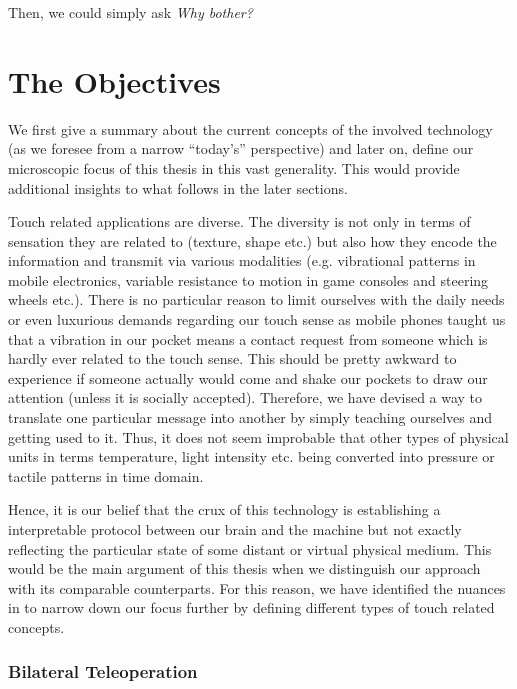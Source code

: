 Then, we could simply ask \emph{Why bother?} 


\section{The Objectives}
\label{sec:intro:obj}

We first give a summary about the current concepts of the involved technology (as we foresee from a narrow \enquote{today's} perspective) 
and later on, define our microscopic focus of this thesis in this vast generality. This would provide additional insights to what follows 
in the later sections.  


Touch related applications are diverse. The diversity is not only in terms of sensation they are related to (texture, shape etc.) but 
also how they encode the information and transmit via various modalities (e.g. vibrational patterns in mobile electronics, variable 
resistance to motion in game consoles and steering wheels etc.). There is no particular reason to limit ourselves with the daily needs or 
even luxurious demands regarding our touch sense as mobile phones taught us that a vibration in our pocket means a contact request from 
someone which is hardly ever related to the touch sense. This should be pretty awkward to experience if someone actually would come and 
shake our pockets to draw our attention (unless it is socially accepted). Therefore, we have devised a way to translate one particular 
message into another by simply teaching ourselves and getting used to it. Thus, it does not seem improbable that other types of physical 
units in terms temperature, light intensity etc. being converted into pressure or tactile patterns in time domain.

Hence, it is our belief that the crux of this technology is establishing a interpretable protocol between our brain and the machine but 
not exactly reflecting the particular state of some distant or virtual physical medium. 
This would be the main argument of this thesis when we distinguish our approach with its comparable counterparts. For this reason, we 
have identified the nuances in  to narrow down our focus further by defining different types of touch related 
concepts.



\subsubsection{Bilateral Teleoperation}

